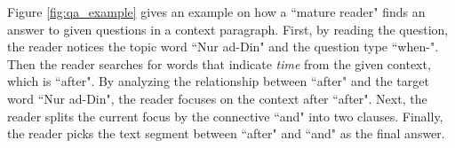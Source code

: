 Figure \ref{fig:qa_example} gives an example on how a ``mature reader" finds an answer to given questions in a context paragraph. First, by reading the question, the reader notices the topic word ``Nur ad-Din" and the question type ``when-". Then the reader searches for words that indicate \emph{time} from the given context, which is ``after". By analyzing the relationship between ``after" and the target word ``Nur ad-Din", the reader focuses on the context after ``after". Next, the reader splits the current focus by the connective ``and" into two clauses. Finally, the reader picks the text segment between ``after" and ``and" as the final answer. 







